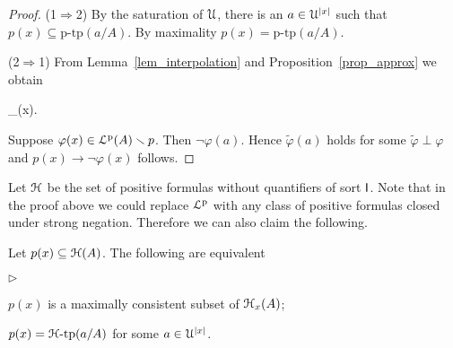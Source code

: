 \documentclass[10pt,oneside]{amsproc}
\newcommand{\mylabel}[1]{{#1}\hfill}
\renewenvironment{itemize}
  {\begin{list}{$\triangleright$}{%
  \setlength{\parskip}{0mm}
  \setlength{\topsep}{.4\baselineskip}
  \setlength{\rightmargin}{0mm}
  \setlength{\listparindent}{0mm}
  \setlength{\itemindent}{0mm}
  \setlength{\labelwidth}{3ex}
  \setlength{\itemsep}{.2\baselineskip}
  \setlength{\parsep}{.2\baselineskip}
  \setlength{\partopsep}{0mm}
  \setlength{\labelsep}{1ex}
  \setlength{\leftmargin}{\labelwidth+\labelsep}
  \let\makelabel\mylabel}}{%
\end{list}}
\begin{document}
\begin{proof}
  (1$\Rightarrow$2) By the saturation of ${\EuScript U}$, there is an $a\in{\EuScript U}^{|x|}$ such that $p(x)\subseteq\mbox{p-tp}(a/A)$.
  By maximality $p(x)=\mbox{p-tp}(a/A)$.


  (2$\Rightarrow$1) 
  From Lemma~\ref{lem_interpolation} and Proposition~\ref{prop_approx} we obtain

  {\rightarrow}
  {\bigvee_{\tilde{\varphi}\perp\varphi}\tilde{\varphi}(x).}

  Suppose $\varphi(x)\in{\EuScript L}^{\rm p}(A)\smallsetminus  p$.
  Then $\neg\varphi(a)$.
  Hence $\tilde{\varphi}(a)$ holds for some $\tilde{\varphi}\perp\varphi$ and $p(x)\rightarrow\neg\varphi(x)$ follows.
\end{proof}

Let ${\EuScript H}$ be the set of positive formulas without quantifiers of sort ${\sf I}$.
Note that in the proof above we could replace ${\EuScript L}^{\rm p}$ with any class of positive formulas closed under strong negation.
Therefore we can also claim the following.

\begin{fact}\label{fact_max_cons_H}
  Let $p(x)\subseteq{\EuScript H}(A)$.
  The following are equivalent 
  \begin{itemize}
    \item[1.] $p(x)$ is a maximally consistent subset of ${\EuScript H}_x(A)$;
    \item[2.] $p(x)={\EuScript H}\mbox{-tp}(a/A)$ for some $a\in{\EuScript U}^{|x|}$.
  \end{itemize}
\end{fact}

 


\end{document}
